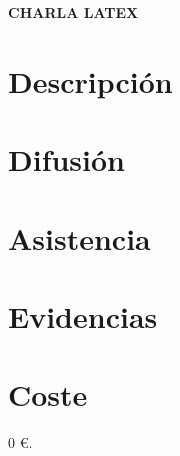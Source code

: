 \documentclass[a4paper,12pt]{article}
\newcommand{\activityName}{Charla LaTeX}
\newcommand{\subject}{\MakeUppercase{\activityName}}
\begin{document}
\begin{center}
    \large \textbf{\subject}
\end{center}


\section{Descripción}

\section{Difusión}

\section{Asistencia}

\section{Evidencias}

\section{Coste}

0 \euro.

\firma
\end{document}
